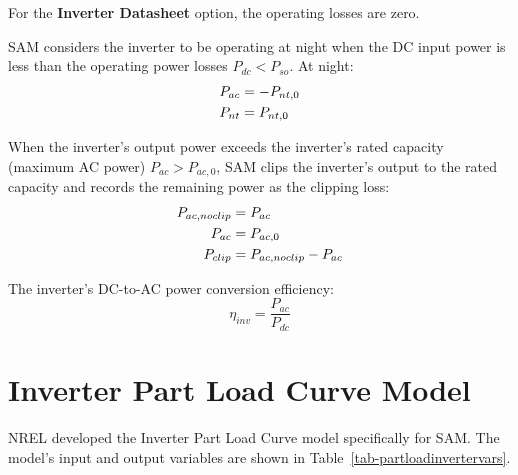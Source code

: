 \documentclass[12pt,letterpaper]{article}
\begin{document}
For the \textbf{Inverter Datasheet} option, the operating losses are zero.

SAM considers the inverter to be operating at night when the DC input power is less than the operating power losses $P_{dc} < P_{so}$. At night:
\begin{align}
P_{ac} &= -P_{nt,0} \notag\\
P_{nt} &= P_{nt,0}
\end{align}

When the inverter's output power exceeds the inverter's rated capacity (maximum AC power) $P_{ac} > P_{ac,0}$, SAM clips the inverter's output to the rated capacity and records the remaining power as the clipping loss:
\begin{align}
P_{ac,noclip} &= P_{ac} \notag\\
P_{ac} &= P_{ac,0} \notag\\
P_{clip} &= P_{ac,noclip} - P_{ac}
\end{align}

The inverter's DC-to-AC power conversion efficiency:
\begin{equation}
\eta_{inv} = \frac{P_{ac}}{P_{dc}}
\end{equation}

\section{Inverter Part Load Curve Model}\label{sec-partloadinverter}

NREL developed the Inverter Part Load Curve model specifically for SAM. The model's input and output variables are shown in Table~\ref{tab-partloadinvertervars}.
\end{document}
